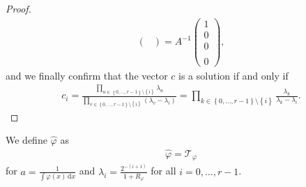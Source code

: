 \begin{proof}
\begin{align*}
\begin{pmatrix}
        \end{pmatrix}
        = A^{-1}\begin{pmatrix}
            1 \\ 0 \\ 0 \\ \\ 0
        \end{pmatrix},
    \end{align*}
    and we finally confirm that the vector \(c\) is a solution if and only if  
    \begin{align*}
        c_i = \frac{\prod\limits_{u \in \left\{ 0, \ldots, r-1 \right\} \setminus \left\{ i \right\} }\lambda_u}{\prod\limits_{v \in \left\{ 0, \ldots, r-1 \right\} \setminus \left\{ i \right\}} (\lambda_v - \lambda_i)} = \prod\limits_{k \in \left\{ 0, \ldots , r-1 \right\} \setminus \left\{ i \right\}} \frac{\lambda_k}{\lambda_k - \lambda_i}.
    \end{align*}
\end{proof}

We define \(\hat \varphi\) as
\begin{align}\label{definition:tweakedvarphi}
    \hat \varphi = \mathcal{T}_{\varphi}
\end{align}
for \(a = \frac{1}{\int \varphi(x) \, \mathrm{d}x}\) and \(\lambda_i = \frac{2^{-(i+1)}}{1+R_\varphi}\) for all \(i = 0,\ldots,r-1\).   
    
